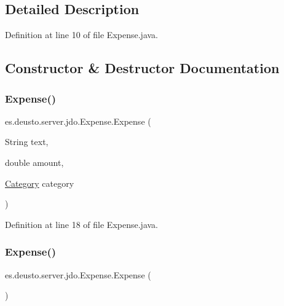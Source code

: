 \subsection{Detailed Description}


Definition at line 10 of file Expense.\+java.



\subsection{Constructor \& Destructor Documentation}
\mbox{\label{classes_1_1deusto_1_1server_1_1jdo_1_1_expense_a80b54e33274b86a95c73577a1d02dfb1}} 
\subsubsection{\texorpdfstring{Expense()}{Expense()}\hspace{0.1cm}{\footnotesize\ttfamily [1/2]}}
{\footnotesize\ttfamily es.\+deusto.\+server.\+jdo.\+Expense.\+Expense (\begin{DoxyParamCaption}\item[{String}]{text,  }\item[{double}]{amount,  }\item[{\hyperlink{enumes_1_1deusto_1_1server_1_1jdo_1_1_category}{Category}}]{category }\end{DoxyParamCaption})}



Definition at line 18 of file Expense.\+java.

\mbox{\label{classes_1_1deusto_1_1server_1_1jdo_1_1_expense_a3e6eb52eb523e57019cc5680dd10ccb9}} 
\subsubsection{\texorpdfstring{Expense()}{Expense()}\hspace{0.1cm}{\footnotesize\ttfamily [2/2]}}
{\footnotesize\ttfamily es.\+deusto.\+server.\+jdo.\+Expense.\+Expense (\begin{DoxyParamCaption}{ }\end{DoxyParamCaption})}



